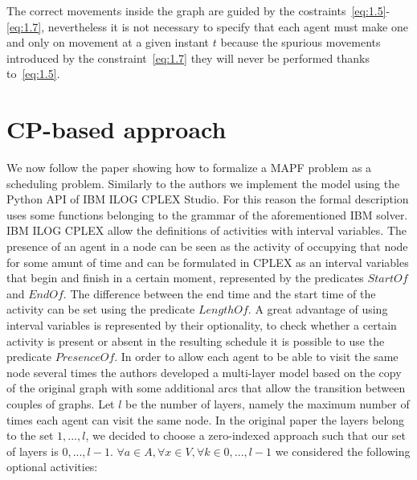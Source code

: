 \documentclass[12pt, a4paper, hidelinks]{article}
\numberwithin{equation}{section}
\begin{document}
The correct movements inside the graph are guided by the costraints~\ref{eq:1.5}-\ref{eq:1.7}, nevertheless it is not necessary to specify that each agent must make one and only on movement at a given instant $t$ because the spurious movements introduced by the constraint~\ref{eq:1.7} they will never be performed thanks to~\ref{eq:1.5}.

\section{CP-based approach}\label{sec:cp-based-approach}

We now follow the paper showing how to formalize a MAPF problem as a scheduling problem.
Similarly to the authors we implement the model using the Python API of IBM ILOG CPLEX Studio.
For this reason the formal description uses some functions belonging to the grammar of the aforementioned IBM solver.
IBM ILOG CPLEX allow the definitions of activities with interval variables.
The presence of an agent in a node can be seen as the activity of occupying that node for some amunt of time and can be formulated in CPLEX as an interval variables that begin and finish in a certain moment, represented by the predicates $StartOf$ and $EndOf$. 
The difference between the end time and the start time of the activity can be set using the predicate $LengthOf$.
A great advantage of using interval variables is represented by their optionality, to check whether a certain activity is present or absent in the resulting schedule it is possible to use the predicate $PresenceOf$.
In order to allow each agent to be able to visit the same node several times the authors developed a multi-layer model based on the copy of the original graph with some additional arcs that allow the transition between couples of graphs.
Let $l$ be the number of layers, namely the maximum number of times each agent can visit the same node. In the original paper the layers belong to the set ${1,...,l}$, we decided to choose a zero-indexed approach such that our set of layers is ${0,...,l-1}$.
$\forall a \in A, \forall x \in V, \forall k \in {0,...,l-1}$ we considered the following optional activities:
\end{document}
